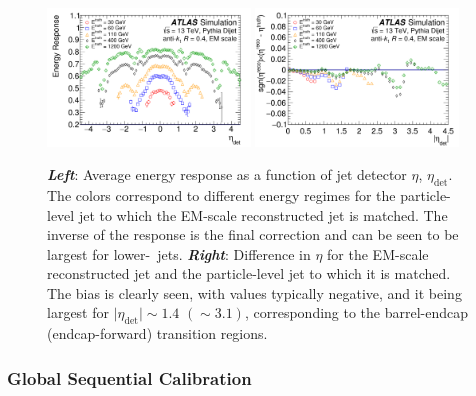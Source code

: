 \begin{figure}[!htb]
    \begin{center}
        \includegraphics[width=0.48\textwidth]{figures/chapter3/jets/abs_jes_response}
        \includegraphics[width=0.48\textwidth]{figures/chapter3/jets/abs_jes_eta}
        \caption{
            \textbf{\textit{Left}}: Average energy response as a function of jet detector $\eta$, $\eta_{\text{det}}$.
            The colors correspond to different energy regimes for the particle-level jet to which the EM-scale
            reconstructed jet is matched. The inverse of the response is the final correction and can be seen to be
            largest for lower-\pT~jets.
            \textbf{\textit{Right}}: Difference in $\eta$ for the EM-scale reconstructed jet and the particle-level jet to which
            it is matched. The bias is clearly seen, with values typically negative, and it being largest
            for $\lvert \eta_{\text{det}} \rvert \sim 1.4$ $(\sim 3.1)$, corresponding to the barrel-endcap (endcap-forward)
            transition regions.
        }
        \label{fig:abs_jes_response}
    \end{center}
\end{figure}
\FloatBarrier

\subsubsection{Global Sequential Calibration}
\label{sec:jet_gsc}

